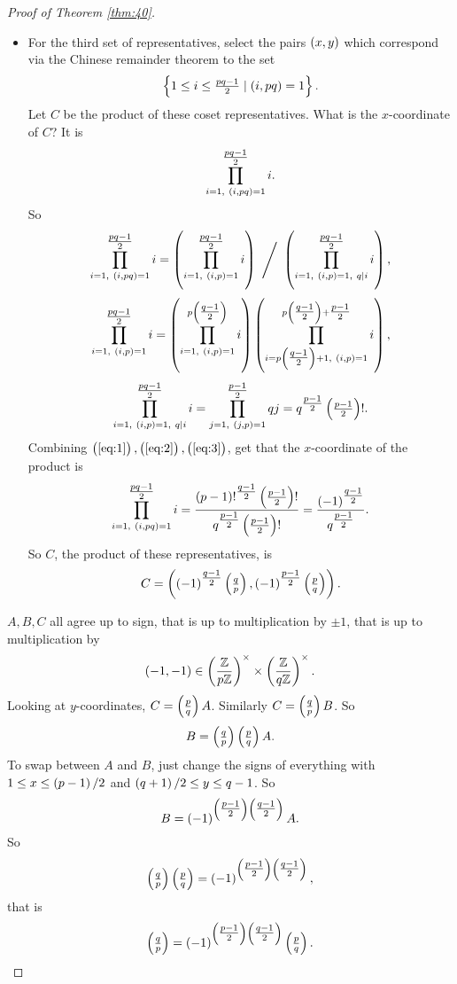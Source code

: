 \begin{proof}[Proof of Theorem \ref{thm:40}]
\begin{itemize}
\item For the third set of representatives, select the pairs $ \br{x, y} $ which correspond via the Chinese remainder theorem to the set
$$ \cbr{1 \le i \le \tfrac{pq - 1}{2} \mid \br{i, pq} = 1}. $$
Let $ C $ be the product of these coset representatives. What is the $ x $-coordinate of $ C $? It is
$$ \prod_{i = 1, \ \br{i, pq} = 1}^{\tfrac{pq - 1}{2}} i. $$
So
\begin{equation}
\label{eq:1}
\prod_{i = 1, \ \br{i, pq} = 1}^{\tfrac{pq - 1}{2}} i = \br{\prod_{i = 1, \ \br{i, p} = 1}^{\tfrac{pq - 1}{2}} i} \ \Bigg/ \ \br{\prod_{i = 1, \ \br{i, p} = 1, \ q \mid i}^{\tfrac{pq - 1}{2}} i},
\end{equation}
\begin{equation}
\label{eq:2}
\prod_{i = 1, \ \br{i, p} = 1}^{\tfrac{pq - 1}{2}} i = \br{\prod_{i = 1, \ \br{i, p} = 1}^{p\br{\tfrac{q - 1}{2}}} i}\br{\prod_{i = p\br{\tfrac{q - 1}{2}} + 1, \ \br{i, p} = 1}^{p\br{\tfrac{q - 1}{2}} + \tfrac{p - 1}{2}} i},
\end{equation}
\begin{equation}
\label{eq:3}
\prod_{i = 1, \ \br{i, p} = 1, \ q \mid i}^{\tfrac{pq - 1}{2}} i = \prod_{j = 1, \ \br{j, p} = 1}^{\tfrac{p - 1}{2}} qj = q^{\tfrac{p - 1}{2}}\br{\tfrac{p - 1}{2}}!.
\end{equation}
Combining $ \br{\ref{eq:1}}, \br{\ref{eq:2}}, \br{\ref{eq:3}} $, get that the $ x $-coordinate of the product is
$$ \prod_{i = 1, \ \br{i, pq} = 1}^{\tfrac{pq - 1}{2}} i = \dfrac{\br{p - 1}!^{\tfrac{q - 1}{2}}\br{\tfrac{p - 1}{2}}!}{q^{\tfrac{p - 1}{2}}\br{\tfrac{p - 1}{2}}!} = \dfrac{\br{-1}^{\tfrac{q - 1}{2}}}{q^{\tfrac{p - 1}{2}}}. $$
So $ C $, the product of these representatives, is
$$ C = \br{\br{-1}^{\tfrac{q - 1}{2}}\jacobi{q}{p}, \br{-1}^{\tfrac{p - 1}{2}}\jacobi{p}{q}}. $$
\end{itemize}
$ A, B, C $ all agree up to sign, that is up to multiplication by $ \pm 1 $, that is up to multiplication by
$$ \br{-1, -1} \in \Unit{p} \times \Unit{q}. $$
Looking at $ y $-coordinates, $ C = \jacobi{p}{q}A $. Similarly $ C = \jacobi{q}{p}B $. So
$$ B = \jacobi{q}{p}\jacobi{p}{q}A. $$
To swap between $ A $ and $ B $, just change the signs of everything with $ 1 \le x \le \br{p - 1} / 2 $ and $ \br{q + 1} / 2 \le y \le q - 1 $. So
$$ B = \br{-1}^{\br{\tfrac{p - 1}{2}}\br{\tfrac{q - 1}{2}}}A. $$
So
$$ \jacobi{q}{p}\jacobi{p}{q} = \br{-1}^{\br{\tfrac{p - 1}{2}}\br{\tfrac{q - 1}{2}}}, $$
that is
$$ \jacobi{q}{p} = \br{-1}^{\br{\tfrac{p - 1}{2}}\br{\tfrac{q - 1}{2}}}\jacobi{p}{q}. $$
\end{proof}

